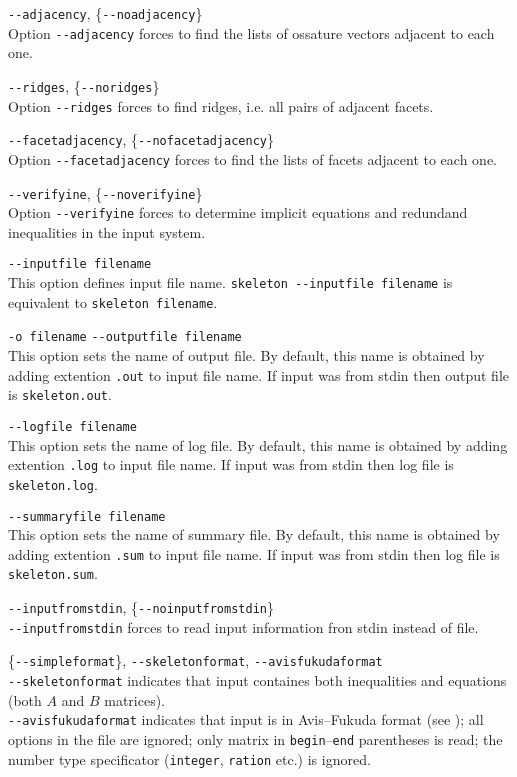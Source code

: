 \documentclass{article}
\newcommand{\params}{\smallskip\hangindent=2\parindent}
\begin{document}
\params \verb$--adjacency$,  \{\verb$--noadjacency$\} \\
  Option \verb$--adjacency$ forces to find the lists of ossature vectors adjacent to each one.
  
\params \verb$--ridges$,  \{\verb$--noridges$\} \\ 
  Option \verb$--ridges$ forces to find ridges, i.e. all pairs of adjacent facets.

\params \verb$--facetadjacency$,  \{\verb$--nofacetadjacency$\} \\
  Option \verb$--facetadjacency$ forces to find the lists of facets adjacent to each one.

\params \verb$--verifyine$,  \{\verb$--noverifyine$\} \\
  Option \verb$--verifyine$ forces to determine implicit equations and redundand inequalities in the input system.

\params \verb$--inputfile filename$ \\
  This option defines input file name. \verb$skeleton --inputfile filename$
  is equivalent to \verb$skeleton filename$.

\params \verb$-o filename$ \verb$--outputfile filename$ \\
  This option sets the name of output file.
  By default, this name is obtained by adding
  extention \verb$.out$ to input file name.
  If input was from stdin then output file is \verb$skeleton.out$.
 
\params \verb$--logfile filename$ \\
  This option sets the name of log file.
  By default, this name is obtained by adding
  extention \verb$.log$ to input file name.
  If input was from stdin then log file is \verb$skeleton.log$.

\params \verb$--summaryfile filename$ \\
  This option sets the name of summary file.
  By default, this name is obtained by adding
  extention \verb$.sum$ to input file name.
  If input was from stdin then log file is \verb$skeleton.sum$.

\params \verb$--inputfromstdin$, \{\verb$--noinputfromstdin$\} \\
  \verb$--inputfromstdin$ forces to read input information fron stdin instead of file.
 
\params \{\verb$--simpleformat$\}, \verb$--skeletonformat$, \verb$--avisfukudaformat$ \\
  \verb$--skeletonformat$ indicates that input containes both inequalities and equations 
                          (both $A$ and $B$ matrices).\\
  \verb$--avisfukudaformat$ indicates that input is in Avis--Fukuda format (see \cite{Fukuda02});
                            all options in the file are ignored; only matrix in \verb$begin$--\verb$end$ 
                            parentheses is read; the number type specificator 
                            (\verb$integer$, \verb$ration$ etc.) is ignored.
                             
\end{document}

